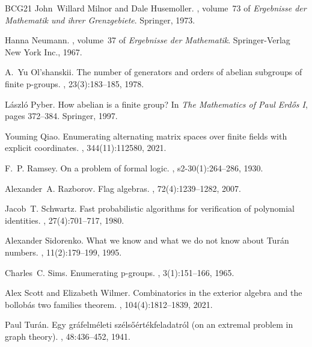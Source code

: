 \begin{thebibliography}{BCG{\etalchar{+}}21}
John~Willard Milnor and Dale Husemoller.
, volume~73 of {\em Ergebnisse der
  Mathematik und ihrer Grenzgebiete}.
\newblock Springer, 1973.

Hanna Neumann.
, volume~37 of {\em Ergebnisse der
  Mathematik}.
\newblock Springer-Verlag New York Inc., 1967.

A.~Yu Ol'shanskii.
\newblock The number of generators and orders of abelian subgroups of finite
  p-groups.
,
  23(3):183--185, 1978.

L{\'a}szl{\'o} Pyber.
\newblock How abelian is a finite group?
\newblock In {\em The Mathematics of Paul Erd\H{o}s I}, pages 372--384.
  Springer, 1997.

Youming Qiao.
\newblock Enumerating alternating matrix spaces over finite fields with
  explicit coordinates.
, 344(11):112580, 2021.

F.~P. Ramsey.
\newblock On a problem of formal logic.
,
  s2-30(1):264--286, 1930.

Alexander~A. Razborov.
\newblock Flag algebras.
, 72(4):1239--1282, 2007.

Jacob~T. Schwartz.
\newblock Fast probabilistic algorithms for verification of polynomial
  identities.
, 27(4):701--717, 1980.

Alexander Sidorenko.
\newblock What we know and what we do not know about {Tur{\'a}n} numbers.
, 11(2):179--199, 1995.

Charles~C. Sims.
\newblock Enumerating p-groups.
, 3(1):151--166,
  1965.

Alex Scott and Elizabeth Wilmer.
\newblock Combinatorics in the exterior algebra and the bollob{\'a}s two
  families theorem.
, 104(4):1812--1839,
  2021.

Paul Tur{\'a}n.
\newblock Egy gr\'afelm\'eleti sz\'els{\H{o}}\'ert\'ekfeladatr\'ol (on an
  extremal problem in graph theory).
, 48:436--452, 1941.


\end{thebibliography}
